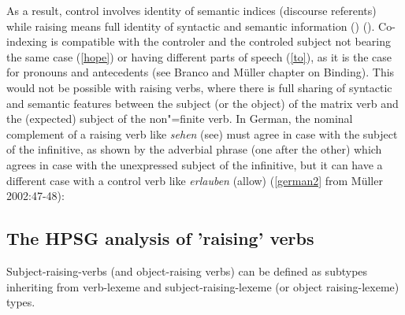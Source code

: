 \documentclass[output=paper
                ,modfonts
                ,nonflat
	        ,collection
	        ,collectionchapter
	        ,collectiontoclongg
 	        ,biblatex
                ,babelshorthands
                ,newtxmath
                ,draftmode
                ,colorlinks, citecolor=brown
]{./langsci/langscibook}
\begin{document}
As a result, control involves identity of semantic indices (discourse referents) while raising means full identity of syntactic and semantic information () (). Co-indexing is compatible with the controler and the controled subject not bearing the same case (\ref{hope}) or having different parts of speech (\ref{to}), as it is the case for pronouns and antecedents (see Branco and Müller chapter on Binding). This would not be possible with raising verbs, where there is full sharing of syntactic and semantic features between the subject (or the object) of the matrix verb and the (expected) subject of the non"=finite verb. In German, the nominal complement of a raising verb like \emph{sehen} (see) must agree in case with the subject of the infinitive, as shown by the adverbial phrase (one after the other) which agrees in case with the unexpressed subject of the infinitive, but it can have a different case with a control verb like \emph{erlauben} (allow) (\ref{german2} from Müller 2002:47-48):



\subsection{The HPSG analysis of 'raising' verbs}
Subject-raising-verbs (and object-raising verbs) can be defined as subtypes inheriting from verb-lexeme and subject-raising-lexeme (or object raising-lexeme) types.
\end{document}
